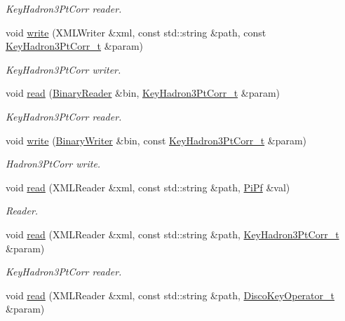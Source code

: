 \begin{DoxyCompactItemize}
\begin{DoxyCompactList}\small\item\em Key\+Hadron3\+Pt\+Corr reader. \end{DoxyCompactList}\item 
void \mbox{\hyperlink{namespaceFF_a9e6eed897710dbad982d5a699a70f857}{write}} (X\+M\+L\+Writer \&xml, const std\+::string \&path, const \mbox{\hyperlink{structFF_1_1KeyHadron3PtCorr__t}{Key\+Hadron3\+Pt\+Corr\+\_\+t}} \&param)
\begin{DoxyCompactList}\small\item\em Key\+Hadron3\+Pt\+Corr writer. \end{DoxyCompactList}\item 
void \mbox{\hyperlink{namespaceFF_a257b587cc1107da7cde8c3d17ea5ce50}{read}} (\mbox{\hyperlink{classADATIO_1_1BinaryReader}{Binary\+Reader}} \&bin, \mbox{\hyperlink{structFF_1_1KeyHadron3PtCorr__t}{Key\+Hadron3\+Pt\+Corr\+\_\+t}} \&param)
\begin{DoxyCompactList}\small\item\em Key\+Hadron3\+Pt\+Corr reader. \end{DoxyCompactList}\item 
void \mbox{\hyperlink{namespaceFF_a7d3abdd11ac7f8c96ec4cfab1360b20a}{write}} (\mbox{\hyperlink{classADATIO_1_1BinaryWriter}{Binary\+Writer}} \&bin, const \mbox{\hyperlink{structFF_1_1KeyHadron3PtCorr__t}{Key\+Hadron3\+Pt\+Corr\+\_\+t}} \&param)
\begin{DoxyCompactList}\small\item\em Hadron3\+Pt\+Corr write. \end{DoxyCompactList}\item 
void \mbox{\hyperlink{namespaceFF_a951fc6aa6ba4be7a0eb44c600fce48f0}{read}} (X\+M\+L\+Reader \&xml, const std\+::string \&path, \mbox{\hyperlink{structFF_1_1PiPf}{Pi\+Pf}} \&val)
\begin{DoxyCompactList}\small\item\em Reader. \end{DoxyCompactList}\item 
void \mbox{\hyperlink{namespaceFF_a457d1bd921b678eadc34fb2dbfcbdb32}{read}} (X\+M\+L\+Reader \&xml, const std\+::string \&path, \mbox{\hyperlink{structFF_1_1KeyHadron3PtCorr__t}{Key\+Hadron3\+Pt\+Corr\+\_\+t}} \&param)
\begin{DoxyCompactList}\small\item\em Key\+Hadron3\+Pt\+Corr reader. \end{DoxyCompactList}\item 
void \mbox{\hyperlink{namespaceFF_a4e59e8e764d20bb787e2992c247ca80f}{read}} (X\+M\+L\+Reader \&xml, const std\+::string \&path, \mbox{\hyperlink{structFF_1_1DiscoKeyOperator__t}{Disco\+Key\+Operator\+\_\+t}} \&param)
\end{DoxyCompactItemize}


